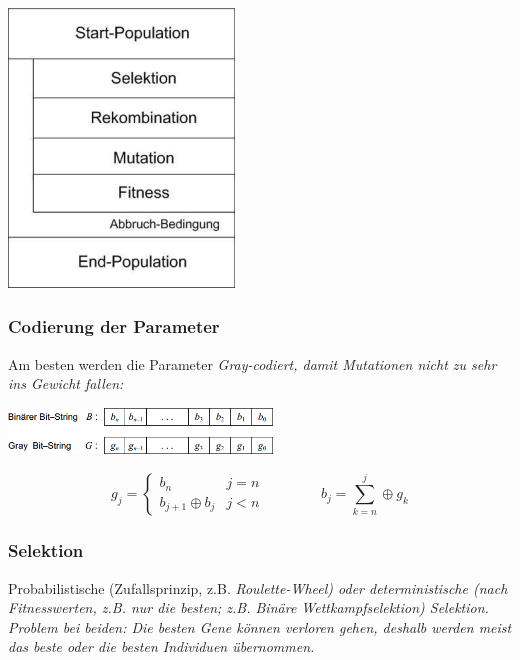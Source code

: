   \begin{minipage}{7cm}
   \begin{flushright}
    \includegraphics[width=6cm]{./Content/MetaHeuristics/GeneticAlgorithms_Principle}
   \end{flushright}
    
    \subsubsection{Codierung der Parameter }
      Am besten werden die Parameter \em Gray\em -codiert, damit Mutationen nicht zu sehr ins Gewicht fallen:
      
      \begin{center}
        \includegraphics[width=7cm]{./Content/MetaHeuristics/GeneticAlgorithms_Gray}
      \end{center}
      $$g_j = \begin{cases}
        b_n                & j=n\\
        b_{j+1} \oplus b_j & j < n
        \end{cases} \qquad \qquad 
      b_j = \sum \limits_{k=n}^j \oplus g_k$$
  \end{minipage}
  
\subsubsection{Selektion }
  Probabilistische (Zufallsprinzip, z.B. \em Roulette-Wheel\em ) oder deterministische (nach Fitnesswerten, z.B. nur die besten; z.B. \em Binäre Wettkampfselektion\em ) Selektion. Problem bei beiden: Die besten Gene können verloren gehen, deshalb werden meist das beste oder die besten Individuen übernommen.
  
